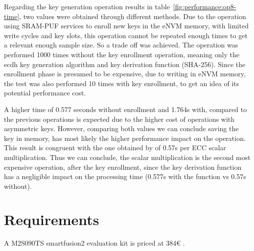 Regarding the key generation operation results in table~\ref{fig:performance:op8-time}, two values were obtained through different methods. Due to the operation using SRAM-PUF services to enroll new keys in the eNVM memory, with limited write cycles and key slots, this operation cannot be repeated enough times to get a relevant enough sample size.
So a trade off was achieved. The operation was performed 1000 times without the key enrollment operation, meaning only the ecdh key generation algorithm and key derivation function (SHA-256).
Since the enrollment phase is presumed to be expensive, due to writing in eNVM memory, the test was also performed 10 times with key enrollment, to get an idea of its potential performance cost.

A higher time of 0.577 seconds without enrollment and 1.764s with, compared to the previous operations is expected due to the higher cost of operations with asymmetric keys.
However, comparing both values we can conclude saving the key in memory, has most likely the higher performance impact on the operation.
This result is congruent with the one obtained by \cite{parrinha2017flexible} of 0.57s per ECC scalar multiplication.
Thus we can conclude, the scalar multiplication is the second most expensive operation, after the key enrollment, since the key derivation function has a negligible impact on the processing time (0.577s with the function vs 0.57s without).

\section{Requirements}\label{chap:evaluation:requirements}

A M2S090TS smartfusion2 evaluation kit is priced at 384€ \cite{smartfusionPrice}.


